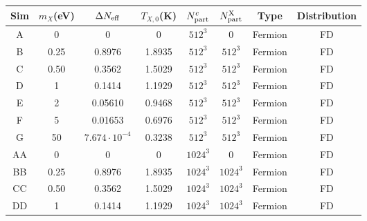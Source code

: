 \documentclass[11pt,a4paper]{article}
\renewcommand\({\left(}
\renewcommand\){\right)}
\renewcommand\[{\left[}
\renewcommand\]{\right]}
\begin{document}
\begin{table}[t]
    \begin{center} 
        \begin{tabular}{c c c c c c c c} 
           \hline%
           Sim &  $m_X$(eV) & $\Delta N_{\rm eff}$ & $T_{X,0}$(K)  & $N_{\rm part}^c$ &  $N_{\rm part}^{\rm X}$ &Type&Distribution \\           
          \hline
          A&      0             & 0                                  & 0               & $512^3$                                & 0                   & Fermion & FD \\  
          B&      0.25        &  0.8976                        & 1.8935       & $512^3$                                 & $512^3$   & Fermion & FD \\
          C&      0.50        &  0.3562                         &  1.5029        & $512^3$                                 & $512^3$ & Fermion & FD   \\
          D&      1             &  0.1414                        &  1.1929        & $512^3$                                 & $512^3$  & Fermion & FD  \\
          E&       2            &  0.05610                      &  0.9468        & $512^3$                                 & $512^3$  & Fermion & FD  \\
          F&       5             &  0.01653                     &  0.6976        & $512^3$                                 & $512^3$  & Fermion & FD  \\
          G  &       50           &  $7.674\cdot 10^{-4}$    &  0.3238         &$512^3$                                 & $512^3$   & Fermion & FD  \\          
          AA &      0             & 0                                & 0                  & $1024^3$                                & 0               & Fermion & FD  \\  
          BB  &      0.25        &  0.8976                       & 1.8935         & $1024^3$                               & $1024^3$& Fermion & FD    \\
          CC  &      0.50       &  0.3562                         &  1.5029        & $1024^3$                               & $1024^3$& Fermion & FD    \\
          DD  &      1          &  0.1414                         &  1.1929        & $1024^3$                                & $1024^3$& Fermion & FD    \\

\end{tabular}
\end{center}
\end{table}
\end{document}
